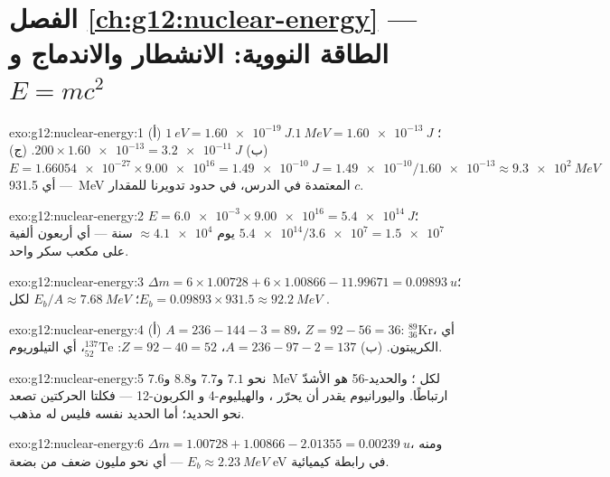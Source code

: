 \section*{الفصل \ref{ch:g12:nuclear-energy} --- الطاقة النووية: الانشطار والاندماج و$E=mc^2$}

\begin{solution}{exo:g12:nuclear-energy:1}
(أ) $\qty{1}{eV} = \qty{1.60e-19}{J}$؛
$\qty{1}{MeV} = \qty{1.60e-13}{J}$.
(ب) $200 \times \num{1.60e-13} = \qty{3.2e-11}{J}$.
(ج) $E = \num{1.66054e-27} \times \num{9.00e16} = \qty{1.49e-10}{J}
= \num{1.49e-10}/\num{1.60e-13} \approx \qty{9.3e2}{MeV}$ --- أي
\qty{931.5}{MeV} المعتمدة في الدرس، في حدود تدويرنا للمقدار $c$.
\end{solution}

\begin{solution}{exo:g12:nuclear-energy:2}
$E = \num{6.0e-3} \times \num{9.00e16} = \qty{5.4e14}{J}$؛
$\num{5.4e14}/\num{3.6e7} = \num{1.5e7}$ يوم $\approx \num{4.1e4}$
سنة --- أي أربعون ألفية على مكعب سكر واحد.
\end{solution}

\begin{solution}{exo:g12:nuclear-energy:3}
$\Delta m = 6 \times 1.00728 + 6 \times 1.00866 - 11.99671 =
\qty{0.09893}{u}$؛ $E_b = 0.09893 \times 931.5 \approx \qty{92.2}{MeV}$؛
$E_b/A \approx \qty{7.68}{MeV}$ لكل .
\end{solution}

\begin{solution}{exo:g12:nuclear-energy:4}
(أ) $A = 236 - 144 - 3 = 89$، $Z = 92 - 56 = 36$:
${}^{89}_{36}\mathrm{Kr}$، أي الكريبتون.
(ب) $A = 236 - 97 - 2 = 137$، $Z = 92 - 40 = 52$:
${}^{137}_{52}\mathrm{Te}$، أي التيلوريوم.
\end{solution}

\begin{solution}{exo:g12:nuclear-energy:5}
نحو $7.1$ و$7.7$ و$8.8$ و\qty{7.6}{MeV} لكل ؛ والحديد-56 هو
الأشدّ ارتباطًا. واليورانيوم يقدر أن يحرّر  ، والهيليوم-4 و
الكربون-12  --- فكلتا الحركتين تصعد نحو الحديد؛ أما الحديد نفسه فليس
له مذهب.
\end{solution}

\begin{solution}{exo:g12:nuclear-energy:6}
$\Delta m = 1.00728 + 1.00866 - 2.01355 = \qty{0.00239}{u}$، ومنه
$E_b \approx \qty{2.23}{MeV}$ --- أي نحو مليون ضعف من بضعة
\unit{eV} في رابطة كيميائية.
\end{solution}

